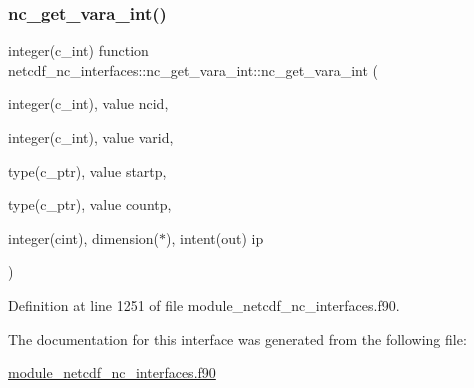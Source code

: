 \subsubsection{\texorpdfstring{nc\+\_\+get\+\_\+vara\+\_\+int()}{nc\_get\_vara\_int()}}
{\footnotesize\ttfamily integer(c\+\_\+int) function netcdf\+\_\+nc\+\_\+interfaces\+::nc\+\_\+get\+\_\+vara\+\_\+int\+::nc\+\_\+get\+\_\+vara\+\_\+int (\begin{DoxyParamCaption}\item[{integer(c\+\_\+int), value}]{ncid,  }\item[{integer(c\+\_\+int), value}]{varid,  }\item[{type(c\+\_\+ptr), value}]{startp,  }\item[{type(c\+\_\+ptr), value}]{countp,  }\item[{integer(cint), dimension($\ast$), intent(out)}]{ip }\end{DoxyParamCaption})}



Definition at line 1251 of file module\+\_\+netcdf\+\_\+nc\+\_\+interfaces.\+f90.



The documentation for this interface was generated from the following file\+:\begin{DoxyCompactItemize}
\item 
\hyperlink{module__netcdf__nc__interfaces_8f90}{module\+\_\+netcdf\+\_\+nc\+\_\+interfaces.\+f90}\end{DoxyCompactItemize}
